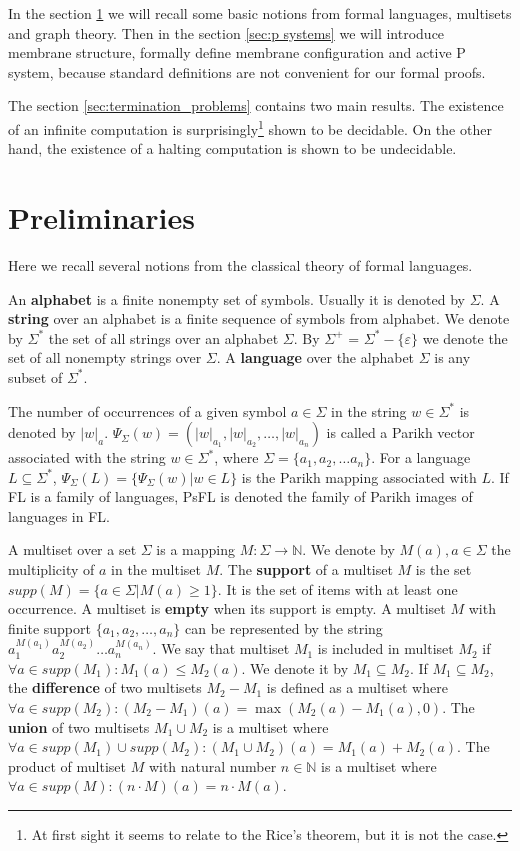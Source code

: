 \documentclass[llncs,submission,copyright,creativecommons]{../lib/lncs/llncs}
\def\eps{\varepsilon}
\begin{document}
In the section \ref{sec:preliminaries} we will recall some basic notions from formal languages, multisets and graph theory. Then in the section \ref{sec:p systems} we will introduce membrane structure, formally define membrane configuration and active P system, because standard definitions are not convenient for our formal proofs.

The section \ref{sec:termination_problems} contains two main results. The existence of an infinite computation is surprisingly\footnote{At first sight it seems to relate to the Rice's theorem, but it is not the case.} shown to be decidable.
On the other hand, the existence of a halting computation is shown to be undecidable.


\section{Preliminaries}
\label{sec:preliminaries}

Here we recall several notions from the classical theory of formal languages.

An {\bf alphabet} is a finite nonempty set of symbols. Usually it is denoted by $\Sigma$. A {\bf string} over an alphabet is a finite sequence of symbols from alphabet. We denote by $\Sigma^*$ the set of all strings over an alphabet $\Sigma$. By $\Sigma^+$ = $\Sigma^* - \{\eps\}$ we denote the set of all nonempty strings over $\Sigma$. A {\bf language} over the alphabet $\Sigma$ is any subset of $\Sigma^*$.

The number of occurrences of a given symbol $a\in \Sigma$ in the string $w\in \Sigma^*$ is denoted by $|w|_a$. $\Psi_\Sigma(w)=(|w|_{a_1},|w|_{a_2},\dots,|w|_{a_n})$ is called a Parikh vector associated with the string $w\in \Sigma^*$, where $\Sigma=\{a_1,a_2,\dots a_n\}$. For a language $L\subseteq \Sigma^*$, $\Psi_\Sigma(L)=\{\Psi_\Sigma(w)|w\in L\}$ is the Parikh mapping associated with $L$. If FL is a family of languages, PsFL is denoted the family of Parikh images of languages in FL.

A multiset over a set $\Sigma$ is a mapping $M: \Sigma\rightarrow \mathbb N$.
We denote by $M(a), a\in \Sigma$ the multiplicity of $a$ in the multiset $M$.
The {\bf support} of a multiset $M$ is the set $supp(M)=\{a\in \Sigma|M(a)\geq 1\}$.
It is the set of items with at least one occurrence.
A multiset is {\bf empty} when its support is empty.
A multiset $M$ with finite support $\{a_1, a_2, \dots, a_n\}$ can be represented by the string $a_1^{M(a_1)}a_2^{M(a_2)}\dots a_n^{M(a_n)}$.
We say that multiset $M_1$ is included in multiset $M_2$ if $\forall a \in supp(M_1): M_1(a)\leq M_2(a)$.
We denote it by $M_1\subseteq M_2$.
If $M_1\subseteq M_2$, the {\bf difference} of two multisets $M_2-M_1$ is defined as a multiset where $\forall a \in supp(M_2): (M_2-M_1)(a)=\max(M_2(a)-M_1(a),0)$.
The {\bf union} of two multisets $M_1\cup M_2$ is a multiset where $\forall a \in supp(M_1)\cup supp(M_2): (M_1\cup M_2)(a)=M_1(a)+M_2(a)$.
The product of multiset $M$ with natural number $n\in \mathbb N$ is a multiset where $\forall a \in supp(M): (n\cdot M)(a)=n\cdot M(a)$.
\end{document}
